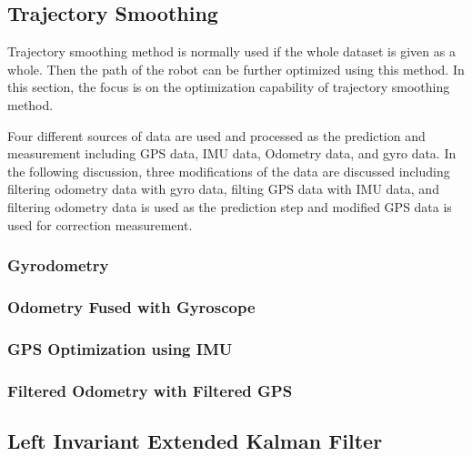 \subsection{Trajectory Smoothing}
Trajectory smoothing method is normally used if the whole dataset is given as a whole. Then the path of the robot can be further optimized using this method. In this section, the focus is on the optimization capability of trajectory smoothing method.

Four different sources of data are used and processed as the prediction and measurement including GPS data, IMU data, Odometry data, and gyro data. In the following discussion, three modifications of the data are discussed including filtering odometry data with gyro data, filting GPS data with IMU data, and filtering odometry data is used as the prediction step and modified GPS data is used for correction measurement.

\subsubsection{Gyrodometry}
\label{sec:gyrodo}

\subsubsection{Odometry Fused with Gyroscope}


\subsubsection{GPS Optimization using IMU}


\subsubsection{Filtered Odometry with Filtered GPS}


\subsection{Left Invariant Extended Kalman Filter}
